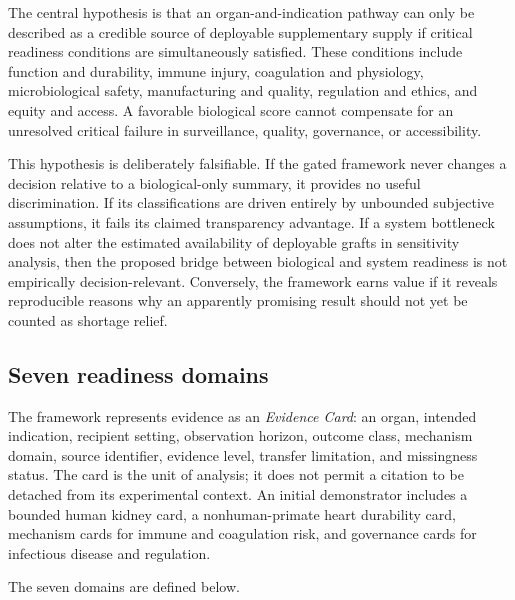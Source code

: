 \documentclass[conference]{IEEEtran}
\begin{document}
The central hypothesis is that an organ-and-indication pathway can only be described as a credible source of deployable supplementary supply if critical readiness conditions are simultaneously satisfied. These conditions include function and durability, immune injury, coagulation and physiology, microbiological safety, manufacturing and quality, regulation and ethics, and equity and access. A favorable biological score cannot compensate for an unresolved critical failure in surveillance, quality, governance, or accessibility.

This hypothesis is deliberately falsifiable. If the gated framework never changes a decision relative to a biological-only summary, it provides no useful discrimination. If its classifications are driven entirely by unbounded subjective assumptions, it fails its claimed transparency advantage. If a system bottleneck does not alter the estimated availability of deployable grafts in sensitivity analysis, then the proposed bridge between biological and system readiness is not empirically decision-relevant. Conversely, the framework earns value if it reveals reproducible reasons why an apparently promising result should not yet be counted as shortage relief.

\subsection{Seven readiness domains}

The framework represents evidence as an \emph{Evidence Card}: an organ, intended indication, recipient setting, observation horizon, outcome class, mechanism domain, source identifier, evidence level, transfer limitation, and missingness status. The card is the unit of analysis; it does not permit a citation to be detached from its experimental context. An initial demonstrator includes a bounded human kidney card, a nonhuman-primate heart durability card, mechanism cards for immune and coagulation risk, and governance cards for infectious disease and regulation.

The seven domains are defined below.
\end{document}
